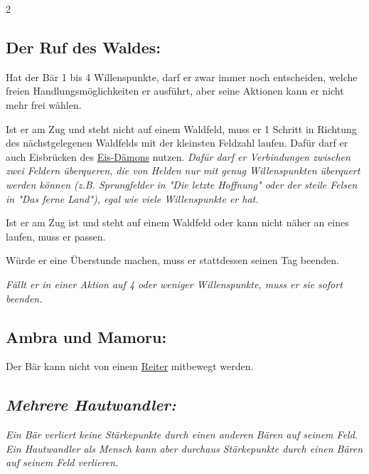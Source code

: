 \documentclass[10pt, a4paper, oneside]{book}
\newcommand{\fan}[1]{\textit{#1}}
\begin{document}
\begin{multicols*}{2}
\begin{nobgcolor}
\subsection{Der Ruf des Waldes:}

Hat der Bär 1 bis 4 Willenspunkte, darf er zwar immer noch entscheiden, welche freien Handlungsmöglichkeiten er ausführt, aber seine Aktionen kann er nicht mehr frei wählen.  

Ist er am Zug und steht nicht auf einem Waldfeld, muss er 1 Schritt in Richtung des nächstgelegenen Waldfelds mit der kleinsten Feldzahl laufen. Dafür darf er auch Eisbrücken des \hyperref[Eis-Dämon]{Eis-Dämons} nutzen. \fan{Dafür darf er Verbindungen zwischen zwei Feldern überqueren, die von Helden nur mit genug Willenspunkten überquert werden können (z.B. Sprungfelder in "Die letzte Hoffnung" oder der steile Felsen in "Das ferne Land"), egal wie viele Willenspunkte er hat.}

Ist er am Zug ist und steht auf einem Waldfeld oder kann nicht näher an eines laufen, muss er passen. 

Würde er eine Überstunde machen, muss er stattdessen seinen Tag beenden.
\supercite{DH:Bär}

\fan{Fällt er in einer Aktion auf 4 oder weniger Willenspunkte, muss er sie sofort beenden.}










\subsection{Ambra und Mamoru:}

Der Bär kann nicht von einem \hyperref[Reiter]{Reiter} mitbewegt werden.
\supercite{DH:Begleitheft}








\subsection{\fan{Mehrere Hautwandler:}}

\fan{Ein Bär verliert keine Stärkepunkte durch einen anderen Bären auf seinem Feld. Ein Hautwandler als Mensch kann aber durchaus Stärkepunkte durch einen Bären auf seinem Feld verlieren.}



\end{nobgcolor}





\end{multicols*}
\end{document}
